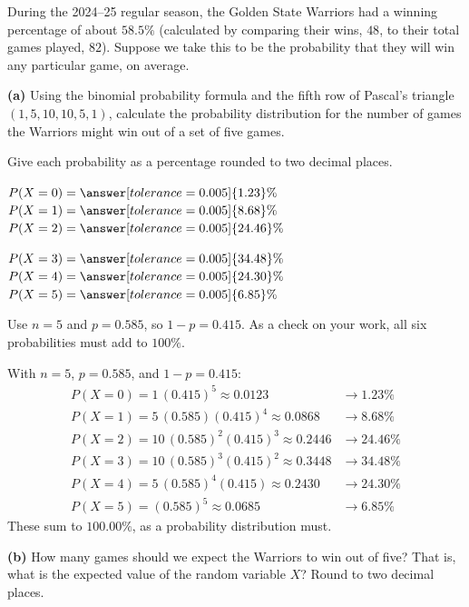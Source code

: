 \documentclass[12pt]{ximera}
\begin{document}
\begin{problem}
During the 2024--25 regular season, the Golden State Warriors had a winning
percentage of about $58.5\%$ (calculated by comparing their wins, $48$, to their
total games played, $82$). Suppose we take this to be the probability that they will
win any particular game, on average.

\begin{prompt}
\textbf{(a)} Using the binomial probability formula and the fifth row of Pascal's
triangle $(1,5,10,10,5,1)$, calculate the probability distribution for the number of
games the Warriors might win out of a set of five games.

Give each probability as a percentage rounded to two decimal places.

$P(X=0)=\answer[tolerance=0.005]{1.23}\%$ \qquad
$P(X=1)=\answer[tolerance=0.005]{8.68}\%$ \qquad
$P(X=2)=\answer[tolerance=0.005]{24.46}\%$

\smallskip
$P(X=3)=\answer[tolerance=0.005]{34.48}\%$ \qquad
$P(X=4)=\answer[tolerance=0.005]{24.30}\%$ \qquad
$P(X=5)=\answer[tolerance=0.005]{6.85}\%$

\begin{hint}
Use $n=5$ and $p=0.585$, so $1-p=0.415$. As a check on your work, all six
probabilities must add to $100\%$.
\end{hint}

\begin{feedback}
With $n=5$, $p=0.585$, and $1-p=0.415$:
\[
\begin{array}{ll}
P(X=0)=1\,(0.415)^5 \approx 0.0123 & \to 1.23\%\\
P(X=1)=5\,(0.585)(0.415)^4 \approx 0.0868 & \to 8.68\%\\
P(X=2)=10\,(0.585)^2(0.415)^3 \approx 0.2446 & \to 24.46\%\\
P(X=3)=10\,(0.585)^3(0.415)^2 \approx 0.3448 & \to 34.48\%\\
P(X=4)=5\,(0.585)^4(0.415) \approx 0.2430 & \to 24.30\%\\
P(X=5)=(0.585)^5 \approx 0.0685 & \to 6.85\%
\end{array}
\]
These sum to $100.00\%$, as a probability distribution must.
\end{feedback}
\end{prompt}

\begin{prompt}
\textbf{(b)} How many games should we expect the Warriors to win out of five? That is,
what is the expected value of the random variable $X$? Round to two decimal places.


\end{prompt}
\end{problem}
\end{document}

